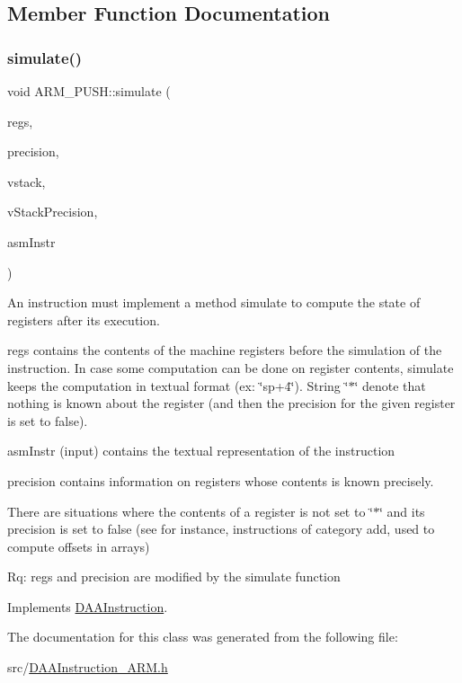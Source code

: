 \subsection{Member Function Documentation}
\mbox{\label{classARM__PUSH_ad2d67e12753861f52a0ee63f55239ca1}} 
\subsubsection{\texorpdfstring{simulate()}{simulate()}}
{\footnotesize\ttfamily void A\+R\+M\+\_\+\+P\+U\+S\+H\+::simulate (\begin{DoxyParamCaption}\item[{\hyperlink{DAAInstruction_8h_af0fae93a861de9cf37988d5673cac523}{reg\+Table} \&}]{regs,  }\item[{\hyperlink{DAAInstruction_8h_a0e8cae02815a5f8adc750122d790b455}{reg\+Precision\+Table} \&}]{precision,  }\item[{\hyperlink{DAAInstruction_8h_a1b0e70ac1a04f06c8132055ed01f589f}{stack\+Type} \&}]{vstack,  }\item[{\hyperlink{DAAInstruction_8h_ac5cb793e9dac3fa9693da78b7e29ab30}{stack\+Prec\+Type} \&}]{v\+Stack\+Precision,  }\item[{const string \&}]{asm\+Instr }\end{DoxyParamCaption})\hspace{0.3cm}{\ttfamily [virtual]}}

An instruction must implement a method simulate to compute the state of registers after its execution.

regs contains the contents of the machine registers before the simulation of the instruction. In case some computation can be done on register contents, simulate keeps the computation in textual format (ex\+: \char`\"{}sp+4\char`\"{}). String \char`\"{}$\ast$\char`\"{} denote that nothing is known about the register (and then the precision for the given register is set to false).

asm\+Instr (input) contains the textual representation of the instruction

precision contains information on registers whose contents is known precisely.

There are situations where the contents of a register is not set to \char`\"{}$\ast$\char`\"{} and its precision is set to false (see for instance, instructions of category add, used to compute offsets in arrays)

Rq\+: regs and precision are modified by the simulate function 

Implements \hyperlink{classDAAInstruction_a61d0b9bece1e0ead89a46c0197276324}{D\+A\+A\+Instruction}.



The documentation for this class was generated from the following file\+:\begin{DoxyCompactItemize}
\item 
src/\hyperlink{DAAInstruction__ARM_8h}{D\+A\+A\+Instruction\+\_\+\+A\+R\+M.\+h}\end{DoxyCompactItemize}
